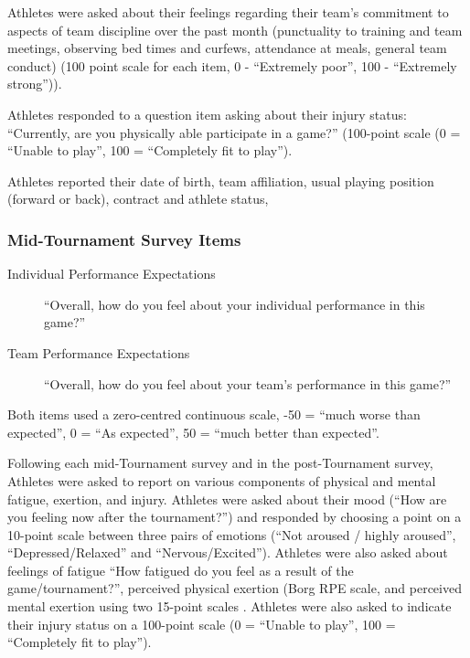 Athletes were asked about their feelings regarding their team's commitment to aspects of team discipline over the past month (punctuality to training and team meetings, observing bed times and curfews, attendance at meals, general team conduct) (100 point scale for each item, 0 - ``Extremely poor'', 100 - ``Extremely strong'')).

Athletes responded to a question item asking about their injury status: ``Currently, are you physically able participate in a game?'' (100-point scale (0 = ``Unable to play'', 100 = ``Completely fit to play'').

Athletes reported their date of birth, team affiliation, usual playing position (forward or back), contract and athlete status,




\subsubsection{\label{app5:surveyMid}Mid-Tournament Survey Items}

\begin{description}
\item [Individual Performance Expectations]``Overall, how do you feel about your individual performance in this game?''
\item [Team Performance Expectations] ``Overall, how do you feel about your team's performance in this game?''
\end{description}
Both items used a zero-centred continuous scale, -50 = ``much worse than expected'', 0 =  ``As expected'', 50 =  ``much better than expected''.

Following each mid-Tournament survey and in the post-Tournament survey, Athletes were asked to report on various components of physical and mental fatigue, exertion, and injury. Athletes were asked about their mood (``How are you feeling now after the tournament?'') and responded by choosing a point on a 10-point scale between three pairs of emotions (``Not aroused / highly aroused'',  ``Depressed/Relaxed'' and  ``Nervous/Excited'').  Athletes were also asked about feelings of fatigue ``How fatigued do you feel as a result of the game/tournament?'', perceived physical exertion (Borg RPE scale, \citep{Borg1990} and perceived mental exertion using two 15-point scales \citep[see][ ]{Noakes2012a}.  Athletes were also asked to indicate their injury status on a 100-point scale (0 = ``Unable to play'', 100 = ``Completely fit to play'').




